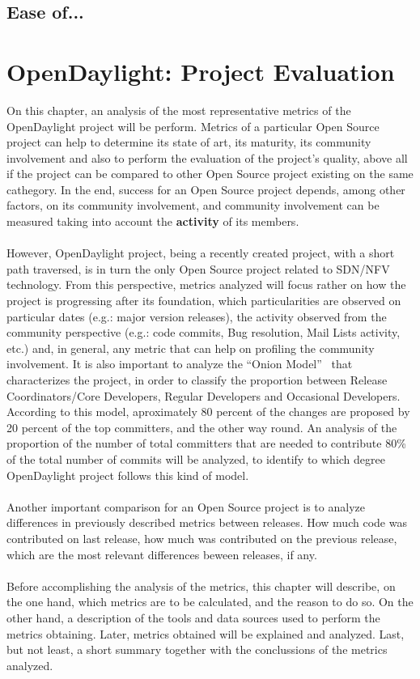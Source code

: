 \documentclass[a4paper, 12pt]{book}
\begin{document}
\section{Ease of...}
\label{chap:odltech_ease}

\chapter{OpenDaylight: Project Evaluation}
\label{chap:odlprojeval}
On this chapter, an analysis of the most representative metrics of the OpenDaylight project will be perform. Metrics of a particular Open Source project can help to determine its state of art, its maturity, its community involvement and also to perform the evaluation of the project's quality, above all if the project can be compared to other Open Source project existing on the same cathegory. In the end, success for an Open Source project depends, among other factors, on its community involvement, and community involvement can be measured taking into account the \textbf{activity} of its members.\\
\\
However, OpenDaylight project, being a recently created project, with a short path traversed, is in turn the only Open Source project related to SDN/NFV technology. From this perspective, metrics analyzed will focus rather on how the project is progressing after its foundation, which particularities are observed on particular dates (e.g.: major version releases), the activity observed from the community perspective (e.g.: code commits, Bug resolution, Mail Lists activity, etc.) and, in general, any metric that can help on profiling the community involvement. It is also important to analyze the ``Onion Model''~\cite{OpenSourceSocialStructure} that characterizes the project, in order to classify the proportion between Release Coordinators/Core Developers, Regular Developers and Occasional Developers. According to this model, aproximately 80 percent of the changes are proposed by 20 percent of the top committers, and the other way round. An analysis of the proportion of the number of total committers that are needed to contribute 80\% of the total number of commits will be analyzed, to identify to which degree OpenDaylight project follows this kind of model.\\
\\
Another important comparison for an Open Source project is to analyze differences in previously described metrics between releases. How much code was contributed on last release, how much was contributed on the previous release, which are the most relevant differences beween releases, if any.\\
\\
Before accomplishing the analysis of the metrics, this chapter will describe, on the one hand, which metrics are to be calculated, and the reason to do so. On the other hand, a description of the tools and data sources used to perform the metrics obtaining. Later, metrics obtained will be explained and analyzed. Last, but not least, a short summary together with the conclussions of the metrics analyzed.
\end{document}
